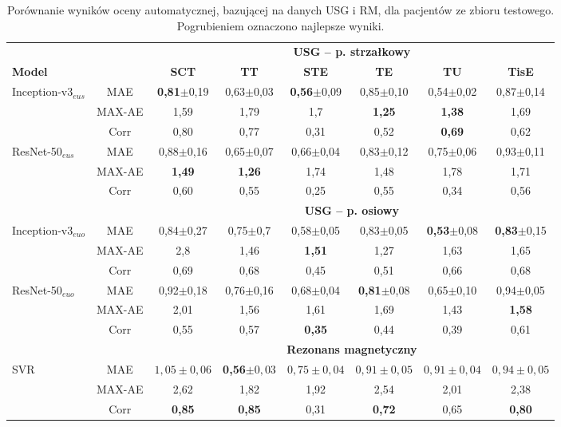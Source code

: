 \renewcommand{\arraystretch}{1.2}
\begin{table}[h]
	\scriptsize
	\setlength{\tabcolsep}{1pt}
	\centering
	\caption{Porównanie wyników oceny automatycznej, bazującej na danych USG i RM, dla pacjentów ze zbioru testowego. Pogrubieniem oznaczono najlepsze wyniki.}
	\label{tab:USGvsRM-cross-validation}
	\vspace{-0.5cm}
	\begin{tabular}{lc||c|c|c|c|c|c}
		& & \multicolumn{6}{c}{\textbf{USG -- p. strzałkowy}} \\
		\textbf{Model} & & \textbf{SCT} & \textbf{TT} & \textbf{STE} & \textbf{TE} & \textbf{TU} & \textbf{TisE} \\ \hline \hline
		Inception-v3$_{eus}$ & MAE & \textbf{0,81}$\pm$0,19 & 0,63$\pm$0,03 & \textbf{0,56}$\pm$0,09 & 0,85$\pm$0,10 & 0,54$\pm$0,02 & 0,87$\pm$0,14 \\
		& MAX-AE & 1,59 & 1,79 & 1,7 & \textbf{1,25} & \textbf{1,38} & 1,69 \\
		& Corr & 0,80 & 0,77 & 0,31 & 0,52 & \textbf{0,69} & 0,62 \\ \hline
		ResNet-50$_{eus}$ & MAE & 0,88$\pm$0,16 & 0,65$\pm$0,07 & 0,66$\pm$0,04 & 0,83$\pm$0,12 & 0,75$\pm$0,06 & 0,93$\pm$0,11 \\
		& MAX-AE & \textbf{1,49} & \textbf{1,26} & 1,74 & 1,48 & 1,78 & 1,71 \\
		& Corr & 0,60 & 0,55 & 0,25 & 0,55 & 0,34 & 0,56 \\
		\hline \hline
		& & \multicolumn{6}{c}{\textbf{USG -- p. osiowy}} \\
		
		Inception-v3$_{euo}$ & MAE & 0,84$\pm$0,27 & 0,75$\pm$0,7 & 0,58$\pm$0,05 & 0,83$\pm$0,05 & \textbf{0,53}$\pm$0,08 & \textbf{0,83}$\pm$0,15 \\
		& MAX-AE & 2,8 & 1,46 & \textbf{1,51} & 1,27 & 1,63 & 1,65 \\
		& Corr & 0,69 & 0,68 & 0,45 & 0,51 & 0,66 & 0,68 \\ \hline
		ResNet-50$_{euo}$ & MAE & 0,92$\pm$0,18 & 0,76$\pm$0,16 & 0,68$\pm$0,04 & \textbf{0,81}$\pm$0,08 & 0,65$\pm$0,10 & 0,94$\pm$0,05 \\
		& MAX-AE & 2,01 & 1,56 & 1,61 & 1,69& 1,43 & \textbf{1,58}\\
		& Corr & 0,55 & 0,57 & \textbf{0,35} & 0,44 & 0,39 & 0,61 \\ \hline \hline
		& & \multicolumn{6}{c}{\textbf{Rezonans magnetyczny}} \\
		
		SVR & MAE & $1,05\pm0,06$ & \textbf{0,56}$\pm0,03$ & $0,75\pm0,04$ & $0,91\pm0,05$ & $0,91\pm0,04$ & $0,94\pm0,05$\\
		& MAX-AE & 2,62 & 1,82 & 1,92 & 2,54 & 2,01 & 2,38 \\
		& Corr   & \textbf{0,85} & \textbf{0,85} & 0,31 & \textbf{0,72} & 0,65 & \textbf{0,80} \\
		 
	\end{tabular}
\end{table}
\renewcommand{\arraystretch}{1}

